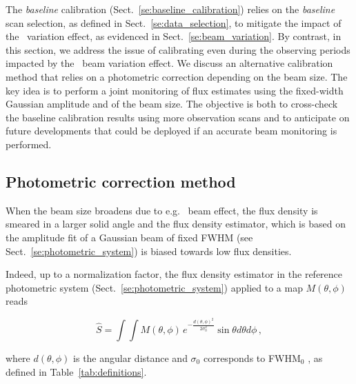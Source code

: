  

The \emph{baseline} calibration (Sect.~\ref{se:baseline_calibration}) relies on
the \emph{baseline} scan selection, as defined in
Sect.~\ref{se:data_selection}, to mitigate the impact of
the \afternoon\ variation effect, as evidenced in Sect.~\ref{se:beam_variation}.
By contrast, in this section, we
address the issue of calibrating even during the observing periods
impacted by the \afternoon\ beam variation effect. We discuss an
alternative calibration method that
relies on a photometric correction depending on the beam size.
{\lp The key idea is to perform a joint monitoring of flux estimates
  using the fixed-width Gaussian amplitude and of the beam size.}
The objective is both to cross-check the baseline calibration results
using more observation scans and to anticipate on future developments
that could be deployed if an accurate beam monitoring is performed.


\subsection{Photometric correction method}
\label{se:photometric_correction_method}

When the beam size broadens due to e.g. \afternoon\ beam effect, the flux
density is smeared in a larger solid angle and the flux density estimator, which
is based on the amplitude fit of a Gaussian beam of fixed FWHM (see
Sect.~\ref{se:photometric_system}) is biased towards low flux
densities.

Indeed, up to a normalization factor, the flux density
estimator in the reference photometric system (Sect.~\ref{se:photometric_system}) applied to a map
$M(\theta,\phi)$ reads

\begin{equation}
  \hat{S}  = \int \int M(\theta, \phi)\, e^{-\frac{d(\theta,\phi)^{2}}{2\sigma_{0}^{2}}} \sin \theta d\theta d\phi\,,
  \label{eq:flux_density_estimator}
\end{equation}

where $d(\theta,\phi)$ is the angular distance and $\sigma_0$
corresponds to FWHM$_0$
, as defined in Table~\ref{tab:definitions}.

